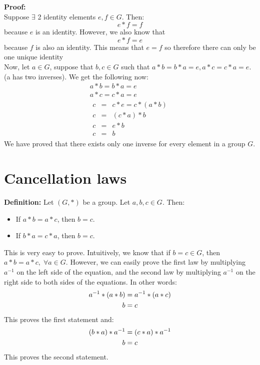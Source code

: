 \documentclass[12pt]{report}
\newcommand{\definitions}[1]{{\leavevmode\color{blue} #1}}
\newcommand{\proof}[1]{{\leavevmode\color{ForestGreen} #1}}
\begin{document}
	\proof{
		\textbf{Proof: }\\
		Suppose $\exists$ 2 identity elements $e,f\in G$. Then: $$e*f=f$$ because $e$ is an identity. However, we also know that $$e*f=e$$ because $f$ is also an identity. This means that $e=f$ so therefore there can only be one unique identity\\
		\vskip 0.05in
		Now, let $a\in G$, suppose that $b,c \in G$ such that $a* b=b* a=e, a* c=c* a=e$. (a has two inverses). We get the following now: 
		\begin{gather*}
			a*b=b*a=e\\
			a*c=c*a=e\\
			\begin{aligned}
				c&=&c*e=c*(a*b)\\
				c&=&(c*a)*b\\
				c&=&e*b\\
				c&=&b
			\end{aligned}
		\end{gather*}
		We have proved that there exists only one inverse for every element in a group $G$. 
	}
	\section{Cancellation laws}
	\definitions{
	\textbf{Definition: }Let $(G,*)$ be a group. Let $a,b,c\in G$. Then: 
	\begin{itemize}
		\item If $a*b=a*c$, then $b=c$. 
		\item If $b*a=c*a$, then $b=c$. 
	\end{itemize}
	}
	\vskip 0.05in
	\proof{
		This is very easy to prove. Intuitively, we know that if $b=c\in G$, then $a*b=a*c, \; \forall a\in G$. However, we can easily prove the first law by multiplying $a^{-1}$ on the left side of the equation, and the second law by multiplying $a^{-1}$ on the right side to both sides of the equations. In other words: 
		\begin{gather}
			\setcounter{equation}{0}
			a^{-1}*(a*b)=a^{-1}*(a*c)\\
			b=c
		\end{gather}
		This proves the first statement and: 
		\begin{gather}
			\setcounter{equation}{0}
			(b*a)*a^{-1}=(c*a)*a^{-1}\\
			b=c
		\end{gather}
		This proves the second statement. 
	}
	\vskip 0.1in
\end{document}
